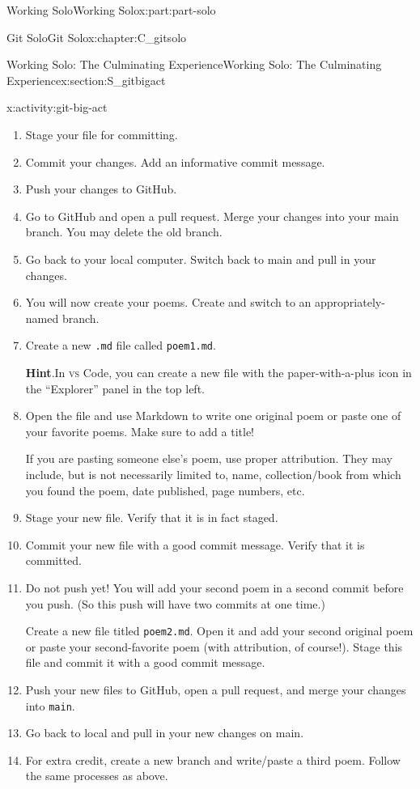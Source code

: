 \documentclass[oneside,10pt,]{book}
\newcommand{\blocktitlefont}{\relax}
\newcommand{\mono}[1]{\texttt{#1}}
\newcommand{\initialism}[1]{\textsc{\MakeLowercase{#1}}}
\begin{document}
\begin{partptx}{Working Solo}{}{Working Solo}{}{}{x:part:part-solo}
\begin{chapterptx}{Git Solo}{}{Git Solo}{}{}{x:chapter:C_gitsolo}
\begin{sectionptx}{Working Solo: The Culminating Experience}{}{Working Solo: The Culminating Experience}{}{}{x:section:S_gitbigact}
\begin{activity}{}{x:activity:git-big-act}
\begin{enumerate}[font=\bfseries,label=(\alph*),ref=\alph*]
\item{}Stage your file for committing.%
\item{}Commit your changes. Add an informative commit message.%
\item{}Push your changes to GitHub.%
\item{}Go to GitHub and open a pull request. Merge your changes into your main branch. You may delete the old branch.%
\item{}Go back to your local computer. Switch back to main and pull in your changes.%
\item{}You will now create your poems. Create and switch to an appropriately-named branch.%
\item{}Create a new \mono{.md} file called \mono{poem1.md}.%
\par\smallskip%
\noindent\textbf{\blocktitlefont Hint}.\hypertarget{g:hint:idp616551992}{}\quad{}In \initialism{VS} Code, you can create a new file with the paper-with-a-plus icon in the ``Explorer'' panel in the top left.%
\item{}Open the file and use Markdown to write one original poem or paste one of your favorite poems. Make sure to add a title!%
\par
If you are pasting someone else's poem, use proper attribution. They may include, but is not necessarily limited to, name, collection\slash{}book from which you found the poem, date published, page numbers, etc.%
\item{}Stage your new file. Verify that it is in fact staged.%
\item{}Commit your new file with a good commit message. Verify that it is committed.%
\item{}Do not push yet! You will add your second poem in a second commit before you push. (So this push will have two commits at one time.)%
\par
Create a new file titled \mono{poem2.md}. Open it and add your second original poem or paste your second-favorite poem (with attribution, of course!). Stage this file and commit it with a good commit message.%
\item{}Push your new files to GitHub, open a pull request, and merge your changes into \mono{main}.%
\item{}Go back to local and pull in your new changes on main.%
\item{}For extra credit, create a new branch and write\slash{}paste a third poem. Follow the same processes as above.%
\end{enumerate}

\end{activity}
\end{sectionptx}
\end{chapterptx}
\end{partptx}
\end{document}

